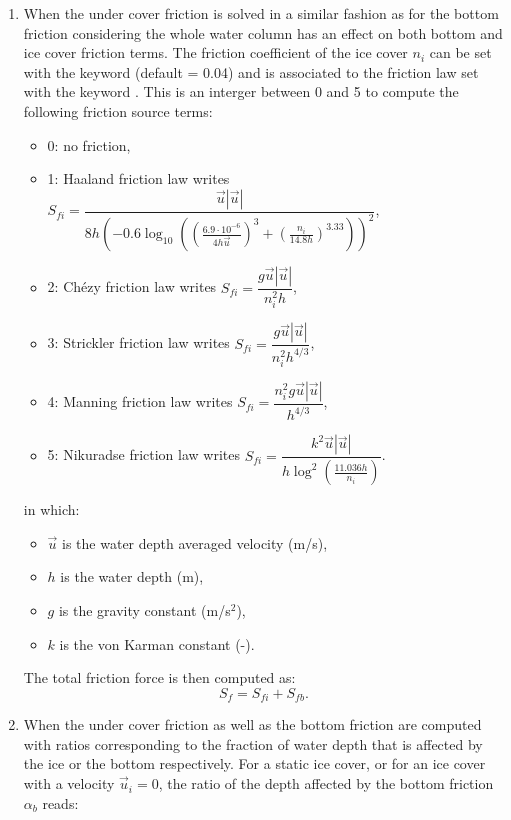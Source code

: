 \begin{enumerate}
\item When  the under cover friction is solved in a similar fashion as for the bottom friction considering the whole water column has an effect on both bottom and ice cover friction terms. 
The friction coefficient of the ice cover $n_i$ can be set with the keyword  (default = 0.04) and is associated to the friction law set with the keyword . This is an interger between 0 and 5 to compute the following friction source terms:

\begin{itemize}
 \item 0: no friction,
 \item 1: Haaland friction law writes $S_{fi}=\dfrac{\vec{u}|\vec{u}|}{8h\left(-0.6\log_{10}\left(\left(\frac{6.9\cdot10^{-6}}{4h\vec{u}}\right)^3+\left(\frac{n_i}{14.8h}\right)^{3.33}\right)\right)^2}$,
 \item 2: Chézy friction law writes $S_{fi}=\dfrac{g\vec{u}|\vec{u}|}{n_i^2h}$,
 \item 3: Strickler friction law writes $S_{fi}=\dfrac{g\vec{u}|\vec{u}|}{n_i^2h^{4/3}}$,
 \item 4: Manning friction law writes $S_{fi}=\dfrac{n_i^2g\vec{u}|\vec{u}|}{h^{4/3}}$,
 \item 5: Nikuradse friction law writes $S_{fi}=\dfrac{k^2\vec{u}|\vec{u}|}{h\log^2\left(\frac{11.036h}{n_i}\right)}$.
\end{itemize}

in which:

\begin{itemize}
 \item $\vec{u}$ is the water depth averaged velocity (m/s),
 \item $h$ is the water depth (m),
 \item $g$ is the gravity constant (m/s$^2$),
 \item $k$ is the von Karman constant (-).
\end{itemize}

The total friction force is then computed as:
\begin{equation}
S_f=S_{fi}+S_{fb}.
\end{equation} 


\item When  the under cover friction as well as the bottom friction
 are computed with ratios corresponding to the fraction of water depth that is affected by the ice or the bottom respectively.
 For a static ice cover, or for an ice cover with a velocity $\vec{u}_i = 0$, the ratio of the depth affected by the bottom friction $\alpha_b$ reads:


\end{enumerate}
